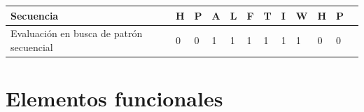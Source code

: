 \vspace{0.5cm}
\noindent
\begin{center}
\begin{tabular}{llllllllllll} 
\hline    
Secuencia & \textbf{H} & \textbf{P} & \textbf{A} & \textbf{L} & \textbf{F} & \textbf{T} & \textbf{I} & \textbf{W} & \textbf{H} &\textbf{P}  \\ \hline
Evaluación en busca de patrón secuencial & 0 & 0 & 1 & 1 & 1 & 1 & 1 & 1 & 0 & 0 \\ \hline
\end{tabular}
\end{center}















































































\section{Elementos funcionales}



